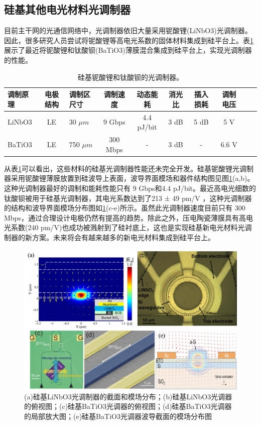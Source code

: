 \subsection{硅基其他电光材料光调制器}
目前主干网的光通信网络中，光调制器依旧大量采用铌酸锂(LiNbO3)光调制器。因此，很多研究人员尝试将铌酸锂等高电光系数的固体材料集成到硅平台上。表\ref{sil_others_mod}展示了最近将铌酸锂和钛酸钡(BaTiO3)薄膜混合集成到硅平台上，实现光调制器的性能。
{
	\begin{table}[htb]
		\caption{硅基铌酸锂和钛酸钡的光调制器。}
		\label{sil_others_mod}
		\centering
		\begin{tabular}[t]{p{1.5cm}cp{1.2cm}ccccccc}
			\hline
			调制原理  & 电极结构 & 调制区尺寸 & 调制速度 & 动态能耗 & 消光比 & 插入损耗 & 调制电压\\
			\hline
			LiNbO3\cite{chen2014hybrid} & LE  & 30 $\mu m$ & 9 Gbps & 4.4 pJ/bit & 3 dB & 5 dB & 5 V\\
			BaTiO3\cite{xiong2014active} & LE  & 750 $\mu m$ & 300 Mbps & - & 3 dB & - & 6.6 V\\
			\hline
		\end{tabular}
	\end{table}
}
从表\ref{sil_others_mod}可以看出，这些材料的硅基光调制器性能还未完全开发。硅基铌酸锂光调制器采用铌酸锂薄膜放置到硅波导上表面，波导界面模场和器件结构图见图\ref{fig_othter_mod.jpg}(a,b)。这种光调制器最好的调制和能耗性能只有 9 Gbps和4.4 pJ/bit。最近高电光细数的钛酸钡被用于硅基光调制器，其电光系数达到了213 ± 49 pm/V \cite{xiong2014active}，这种光调制器的结构和波导界面模场分布图如\ref{fig_othter_mod.jpg}(c-e)所示。虽然此光调制器速度目前只有 300 Mbps，通过合理设计电极仍然有提高的趋势。除此之外，压电陶瓷薄膜具有高电光系数(240 pm/V)也成功被溅射到了硅衬底上\cite{george2015lanthanide}，这也是实现硅基新电光材料光调制器的新方案。未来将会有越来越多的新电光材料集成到硅平台上。
\begin{figure}[htb]
	\centering
	\includegraphics[width=12cm]{./Pictures/fig_othter_mod.jpg}
	\caption{ (a)硅基LiNbO3光调制器的截面和模场分布\cite{chen2014hybrid}；(b)硅基LiNbO3光调器的俯视图\cite{palmer2014high}；(c)硅基BaTiO3光调器的俯视图\cite{xiong2014active}；(d)硅基BaTiO3光调器的局部放大图\cite{xiong2014active}；(e)硅基BaTiO3光调器波导截面的模场分布图\cite{xiong2014active}}
	\label{fig_othter_mod.jpg}
\end{figure}
